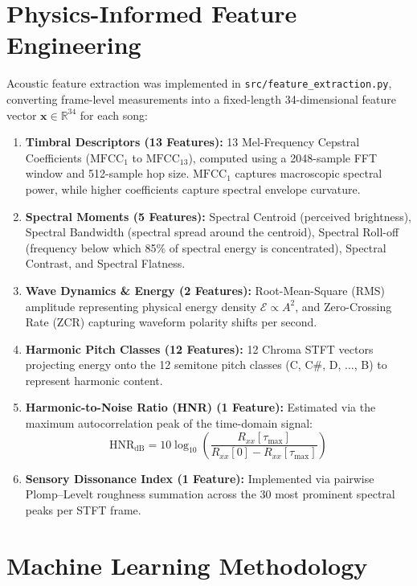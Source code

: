 \documentclass[conference]{IEEEtran}
\begin{document}
\section{Physics-Informed Feature Engineering}
Acoustic feature extraction was implemented in \texttt{src/feature\_extraction.py}, converting frame-level measurements into a fixed-length 34-dimensional feature vector $\mathbf{x} \in \mathbb{R}^{34}$ for each song:

\begin{enumerate}
    \item \textbf{Timbral Descriptors (13 Features):} 13 Mel-Frequency Cepstral Coefficients ($\text{MFCC}_1$ to $\text{MFCC}_{13}$), computed using a 2048-sample FFT window and 512-sample hop size. $\text{MFCC}_1$ captures macroscopic spectral power, while higher coefficients capture spectral envelope curvature.
    \item \textbf{Spectral Moments (5 Features):} Spectral Centroid (perceived brightness), Spectral Bandwidth (spectral spread around the centroid), Spectral Roll-off (frequency below which 85\% of spectral energy is concentrated), Spectral Contrast, and Spectral Flatness.
    \item \textbf{Wave Dynamics \& Energy (2 Features):} Root-Mean-Square (RMS) amplitude representing physical energy density $\mathcal{E} \propto A^2$, and Zero-Crossing Rate (ZCR) capturing waveform polarity shifts per second.
    \item \textbf{Harmonic Pitch Classes (12 Features):} 12 Chroma STFT vectors projecting energy onto the 12 semitone pitch classes (C, C\#, D, ..., B) to represent harmonic content.
    \item \textbf{Harmonic-to-Noise Ratio (HNR) (1 Feature):} Estimated via the maximum autocorrelation peak of the time-domain signal:
    \begin{equation}
    \text{HNR}_{\text{dB}} = 10 \log_{10} \left( \frac{R_{xx}[\tau_{\max}]}{R_{xx}[0] - R_{xx}[\tau_{\max}]} \right)
    \end{equation}
    \item \textbf{Sensory Dissonance Index (1 Feature):} Implemented via pairwise Plomp--Levelt roughness summation across the 30 most prominent spectral peaks per STFT frame.
\end{enumerate}

\section{Machine Learning Methodology}
\end{document}
